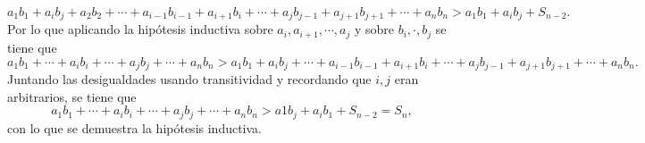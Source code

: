 \documentclass{ayudantia}
\begin{document}
\begin{ans}
\begin{sol}
        \begin{equation*}
            a_1b_1+a_ib_j+a_2b_2+\cdots+a_{i-1}b_{i-1}+a_{i+1}b_i+\cdots+a_jb_{j-1}+a_{j+1}b_{j+1}+\cdots+a_nb_n>a_1b_1+a_ib_j+S_{n-2}.
        \end{equation*}
        Por lo que aplicando la hipótesis inductiva sobre \(a_i,a_{i+1},\cdots,a_j\) y sobre \(b_i,\cdot, b_j\) se tiene que
        \begin{equation*}
            a_1b_1+\cdots+a_ib_i+\cdots+a_jb_j+\cdots+a_nb_n>a_1b_1+a_ib_j+\cdots+a_{i-1}b_{i-1}+a_{i+1}b_i+\cdots+a_jb_{j-1}+a_{j+1}b_{j+1}+\cdots+a_nb_n.
        \end{equation*}
        Juntando las desigualdades usando transitividad y recordando que \(i,j\) eran arbitrarios, se tiene que
        \begin{equation*}
            a_1b_1+\cdots+a_ib_i+\cdots+a_jb_j+\cdots+a_nb_n>a1b_j+a_ib_1+S_{n-2}=S_n,
        \end{equation*}
        con lo que se demuestra la hipótesis inductiva.
    \end{sol}
\end{ans}
\end{document}
